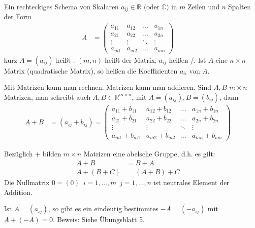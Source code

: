 

Ein rechteckiges Schema von Skalaren $a_{ij} \in \mathbb{R}\text{ (oder }\mathbb{C}\text{)}$ in $m$ Zeilen und $n$ Spalten der Form
\begin{align*}
    A &=
    \begin{pmatrix}
        a_{11} & a_{12} & \dots & a_{1n} \\
        a_{21} & a_{22} & \dots & a_{2n} \\
        \vdots & \vdots & \ddots & \vdots \\
        a_{m1} & a_{m2} & \dots & a_{mn}
    \end{pmatrix}
\end{align*}
kurz $A = (a_{ij})$ heißt . $(m, n)$ heißt  der Matrix, $a_{ij}$ heißen /. Ist $A$ eine $n \times n$ Matrix (quadratische Matrix), so heißen die Koeffizienten $a_{ii}$  von $A$.

Mit Matrizen kann man rechnen. Matrizen kann man addieren. Sind $A, B$ $m \times n$ Matrizen, man schreibt auch $A, B \in \mathbb{R}^{m \times n}$, mit $A = (a_{ij}), B = (b_{ij})$, dann
\begin{align*}
    A + B &= (a_{ij} + b_{ij}) =
    \begin{pmatrix}
        a_{11} + b_{11} & a_{12} + b_{12} & \dots & a_{1n} + b_{1n} \\
        a_{21} + b_{21} & a_{22} + b_{22} & \dots & a_{2n} + b_{2n} \\
        \vdots & \vdots & \ddots & \vdots \\
        a_{m1} + b_{m1} & a_{m2} + b_{m2} & \dots & a_{mn} + b_{mn}
    \end{pmatrix}
\end{align*}

Bezüglich \glqq{}$+$\grqq{} bilden $m \times n$ Matrizen eine abelsche Gruppe, d.h. es gilt:
\begin{align*}
    A + B &= B + A \\
    A + (B + C) &= (A + B) + C
\end{align*}
Die Nullmatrix $0 = (0)\enspace i = 1,\dots,m\enspace j = 1,\dots,n$ ist neutrales Element der Addition.

Ist $A = (a_{ij})$, so gibt es ein eindeutig bestimmtes $-A = (-a_{ij})$ mit $A + (-A) = 0$. Beweis: Siehe Übungsblatt 5.

